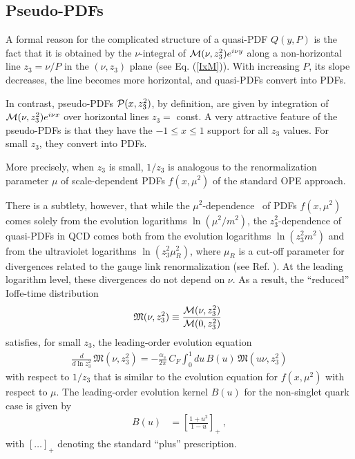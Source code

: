 \documentclass[aps,prd,twocolumn,showpacs,preprintnumbers,superscriptaddress,groupedaddress]{revtex4-1}
\begin{document}
\subsection{Pseudo-PDFs}  

A  formal  reason for the   complicated structure  of a quasi-PDF
$Q(y,P)$ 
is the fact that it is  obtained by the  $\nu$-integral of 
${\cal M} (\nu, z_3^2)e^{i \nu y}$ 
 along a non-horizontal line $z_3=\nu/P$ 
in  the $(\nu, z_3)$  plane (see Eq. (\ref{IxM})).  With increasing $P$, its slope 
decreases,  the line becomes more  horizontal,
and quasi-PDFs convert into PDFs.

In contrast,  pseudo-PDFs ${\cal P} (x,z_3^2)$,
by definition,  are given by integration of ${\cal M} (\nu, z_3^2)e^{i \nu x}$  over 
horizontal lines $z_3=$ const.  A very attractive feature of the  pseudo-PDFs is that they 
  have 
the $-1\leq x \leq 1$ support  for all $z_3$ values.  For small $z_3$, 
they   convert  into PDFs.

 More precisely,  when $z_3$  is small, $1/z_3$
 is analogous to the renormalization parameter $\mu$ 
of scale-dependent PDFs $f(x,\mu^2)$ of the standard OPE approach.  

There is a  subtlety, however, that  while the \mbox{$\mu^2$-dependence } 
of PDFs $f(x,\mu^2)$ comes  solely from the evolution logarithms  $\ln (\mu^2/m^2)$,
the $z_3^2$-dependence of quasi-PDFs in QCD comes both from
the evolution logarithms  $\ln (z_3^2 m^2)$
and from the ultraviolet logarithms  $\ln (z_3^2 \mu_R^2)$,
where $\mu_R$ is a   cut-off parameter for divergences related to the gauge link
renormalization (see Ref. \cite{Craigie:1980qs}). 
At the leading logarithm level, these divergences do not depend on $\nu$.
As a result, the ``reduced''  Ioffe-time distribution 
 \begin{align}
{\mathfrak M} (\nu, z_3^2) \equiv \frac{ {\cal M} (\nu, z_3^2)}{{\cal M} (0, z_3^2)} \  
 \label{redm}
\end{align}
satisfies,  
 for small $z_3$,  the   leading-order evolution equation   
     \begin{align}
    \frac{d}{d \ln z_3^2} \,  
{\mathfrak M} (\nu, z_3^2)    = - \frac{\alpha_s}{2\pi} \, C_F 
\int_0^1  du \,   B ( u )  \,   {\mathfrak  M} (u \nu, z_3^2)  
\label{74}
 \end{align}
 with respect to $1/z_3$ 
  that 
is similar to  the evolution equation for $f (x,\mu^2)$ with respect to $\mu$. 
The leading-order evolution kernel $B(u)$ for the non-singlet quark case
is given  \cite{Braun:1994jq} by
   \begin{align}
B (u)    &=  \left [ \frac{1+u^2}{1- u} \right ]_+  \ 
 , 
\label{74a}
 \end{align} 
 with $[ \ldots ]_+$  denoting the standard ``plus'' prescription. 
\end{document}
